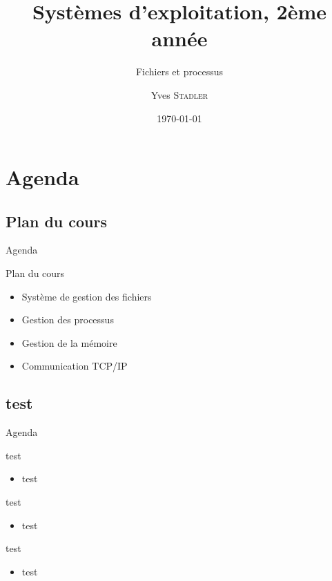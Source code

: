 
\title{Systèmes d'exploitation, 2ème année}
\subtitle{Fichiers et processus}

\author{Yves \textsc{Stadler}}

\date{\today}




\begin{frame}
\titlepage
\end{frame}

\def\sectitle{Agenda}
\section{\sectitle}
\def\subsectitle{Plan du cours}
\subsection{\subsectitle}

\begin{frame}{\sectitle}
\begin{block}{\subsectitle}
\begin{itemize}
\item Système de gestion des fichiers
\item Gestion des processus
\item Gestion de la mémoire
\item Communication TCP/IP
\end{itemize}
\end{block}
\end{frame}

\def\subsectitle{test}
\subsection{\subsectitle}


\begin{frame}{\sectitle}
\begin{alertblock}{\subsectitle}
\begin{itemize}
\item test 
\end{itemize}
\end{alertblock}

\begin{exampleblock}{test}
\begin{itemize}
\item test
\end{itemize}

\end{exampleblock}

\begin{block}{test}
\begin{itemize}
\item test
\end{itemize}

\end{block}

\end{frame}



